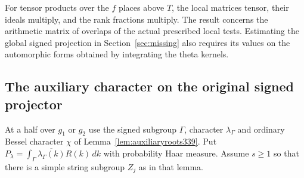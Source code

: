 \documentclass[a4paper,11pt]{article}
\theoremstyle{definition}
\theoremstyle{remark}
\numberwithin{equation}{section}
\begin{document}
For tensor products over the $f$ places above $T$, the local matrices
tensor, their ideals multiply, and the rank fractions multiply. The
result concerns the arithmetic matrix of overlaps of the actual
prescribed local tests. Estimating the global signed projection in
Section~\ref{sec:missing} also requires its values on the automorphic
forms obtained by integrating the theta kernels.


\subsection{The auxiliary character on the original signed projector}\label{sec:signedreturn342}
At a half over $g_1$ or $g_2$ use the signed subgroup $\Gamma$,
character $\lambda_\Gamma$ and ordinary Bessel character $\chi$ of
Lemma~\ref{lem:auxiliaryroots339}. Put $P_\lambda=\int_\Gamma
\overline{\lambda_\Gamma(k)}R(k)\,dk$ with probability Haar measure.
Assume $s\ge1$ so that there is a simple string subgroup $Z_j$ as
in that lemma.
\end{document}
